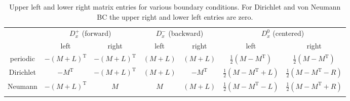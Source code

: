 \begin{longtable}{ccccccc}
  \toprule
 & \multicolumn{ 2}{c}{$D_x^+$ (forward)} & \multicolumn{ 2}{c}{$D_x^-$ (backward)} & \multicolumn{ 2}{c}{ $D_x^0$ (centered)} \\ 
 & left & right & left  & right & left  & right \\ 
periodic & $-(M+L)^\mathrm{T}$ & $-(M+L)^\mathrm{T}$ & $(M+L)$ & $(M+L)$ & $\frac{1}{2}(M-M^\mathrm{T})$ & $\frac{1}{2}(M-M^\mathrm{T})$ \\ 
Dirichlet & $-M^\mathrm{T}$ & $-(M+L)^\mathrm{T}$ & $(M+L)$ & $-M^\mathrm{T}$ & $\frac{1}{2}(M-M^\mathrm{T}+L)$ & $\frac{1}{2}(M-M^\mathrm{T}-R)$ \\ 
Neumann & $-(M+L)^\mathrm{T}$ & $M$ & $M$ & $(M+L)$ & $\frac{1}{2}(M-M^\mathrm{T}-L)$ & $\frac{1}{2}(M-M^\mathrm{T}+R)$ \\ 
\bottomrule
\caption{Upper left and lower right matrix entries for various boundary conditions. For Dirichlet and von Neumann BC the upper right and lower left entries are zero.}
\label{tab:boundary_terms}
\end{longtable}
